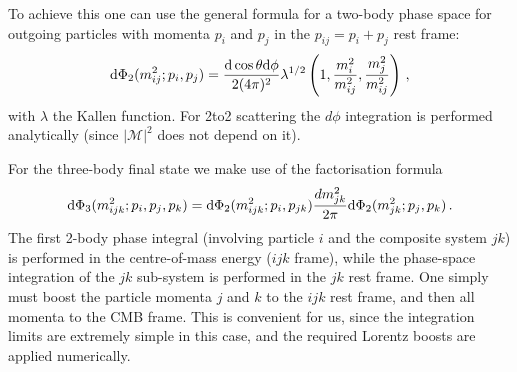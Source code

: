 \documentclass[a4paper,11pt]{article}
\def \beq{\begin{equation}}
\def \eeq{\end{equation}}
\begin{document}
To achieve this one can use the general formula for a two-body phase space for outgoing particles with momenta $p_i$ and $p_j$ in the $p_{ij} = p_i + p_j$ rest frame:
%
\beq
{\rm d}\Phi_2(m_{ij}^2;p_i,p_j) = \frac{\rm d \cos \theta d \phi}{2(4\pi)^2} \lambda^{1/2}\left(1,\frac{m_i^2}{m_{ij}^2},\frac{m_j^2}{m_{ij}^2}\right)\,,
\eeq
%
with $\lambda$ the Kallen function.
%
For 2to2 scattering the $d\phi$ integration is performed analytically (since $|\mathcal{M}|^2$ does not depend on it).

For the three-body final state we make use of the factorisation formula
%
\beq
{\rm d}\Phi_3(m_{ijk}^2;p_i,p_j,p_k) = {\rm d}\Phi_2(m_{ijk}^2;p_i,p_{jk}) \frac{d m_{jk}^2}{2 \pi} {\rm d}\Phi_2(m_{jk}^2;p_j,p_k)\,.
\eeq
%
The first 2-body phase integral (involving particle $i$ and the composite system $jk$) is performed in the centre-of-mass energy ($ijk$ frame), while the phase-space integration of the $jk$ sub-system is performed in the $jk$ rest frame. One simply must boost the particle momenta $j$ and $k$ to the $ijk$ rest frame, and then all momenta to the CMB frame.
%
This is convenient for us, since the integration limits are extremely simple in this case, and the required Lorentz boosts are applied numerically.



\end{document}
